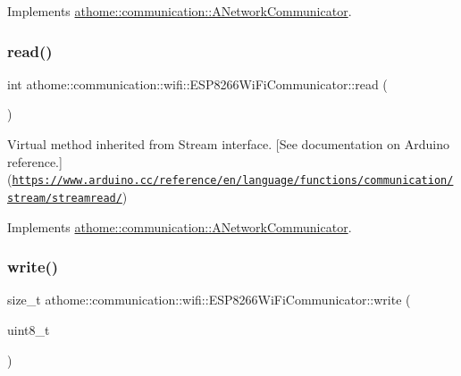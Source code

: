 Implements \mbox{\hyperlink{classathome_1_1communication_1_1_a_network_communicator_ad06ecdc94aa77b1bab934b85bed2ac7d}{athome\+::communication\+::\+A\+Network\+Communicator}}.

\mbox{\label{classathome_1_1communication_1_1wifi_1_1_e_s_p8266_wi_fi_communicator_a1cadc570e912c164279ef0ebc5b178a5}} 
\subsubsection{\texorpdfstring{read()}{read()}}
{\footnotesize\ttfamily int athome\+::communication\+::wifi\+::\+E\+S\+P8266\+Wi\+Fi\+Communicator\+::read (\begin{DoxyParamCaption}{ }\end{DoxyParamCaption})\hspace{0.3cm}{\ttfamily [virtual]}}

Virtual method inherited from Stream interface. \mbox{[}See documentation on Arduino reference.\mbox{]}(\href{https://www.arduino.cc/reference/en/language/functions/communication/stream/streamread/}{\tt https\+://www.\+arduino.\+cc/reference/en/language/functions/communication/stream/streamread/}) 

Implements \mbox{\hyperlink{classathome_1_1communication_1_1_a_network_communicator_a88d3c4366daf48865ab48b22eb62d610}{athome\+::communication\+::\+A\+Network\+Communicator}}.

\mbox{\label{classathome_1_1communication_1_1wifi_1_1_e_s_p8266_wi_fi_communicator_afd3c1c4ce7d68717a7bb2cf1b9dc962f}} 
\subsubsection{\texorpdfstring{write()}{write()}}
{\footnotesize\ttfamily size\+\_\+t athome\+::communication\+::wifi\+::\+E\+S\+P8266\+Wi\+Fi\+Communicator\+::write (\begin{DoxyParamCaption}\item[{uint8\+\_\+t}]{ }\end{DoxyParamCaption})\hspace{0.3cm}{\ttfamily [virtual]}}

